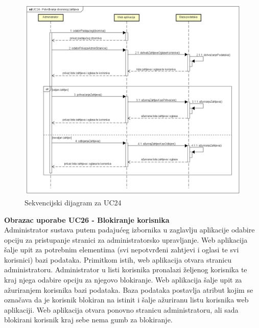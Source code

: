 				\begin{figure}[htb]
					\centering
					\includegraphics[width=14cm]{slike/Sekvencijski dijagram - UC24}
					\caption{Sekvencijski dijagram za UC24}
					\label{fig:Sekvencijski-UC24}
				\end{figure}
				\eject	
				
				\textbf{Obrazac uporabe UC26 - Blokiranje korisnika}\\
				
				Administrator sustava putem padajućeg izbornika u zaglavlju aplikacije odabire opciju za pristupanje stranici za administratorsko upravljanje. Web aplikacija šalje upit za potrebnim elementima (svi nepotvrđeni zahtjevi i oglasi te svi korisnici) bazi podataka. Primitkom istih, web aplikacija otvara stranicu administratoru. Administrator u listi korisnika pronalazi željenog korisnika te kraj njega odabire opciju za njegovo blokiranje. Web aplikacija šalje upit za ažuriranjem korisnika bazi podataka. Baza podataka postavlja atribut kojim se označava da je korisnik blokiran na istinit i šalje ažuriranu listu korisnika web aplikaciji. Web aplikacija otvara ponovno stranicu administratoru, ali sada blokirani korisnik kraj sebe nema gumb za blokiranje.
				
